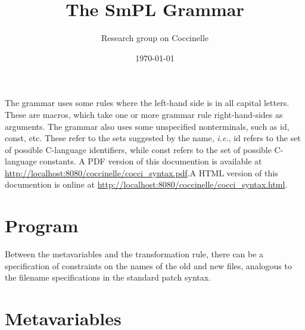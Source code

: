 \documentclass{article}
\title{The SmPL Grammar}
\author{Research group on Coccinelle}
\date{\today}
\begin{document}
\maketitle



The grammar uses some rules where the left-hand side is in all capital
letters.  These are macros, which take one or more grammar rule
right-hand-sides as arguments.  The grammar also uses some unspecified
nonterminals, such as {\sf id}, {\sf const}, etc.  These refer to the
sets suggested by the name, {\em i.e.}, {\sf id} refers to the set of
possible C-language identifiers, while {\sf const} refers to the set
of possible C-language constants. \ifhevea A PDF version of this
documention is available at
\url{http://localhost:8080/coccinelle/cocci_syntax.pdf}.\else A HTML
version of this documention is online at
\url{http://localhost:8080/coccinelle/cocci_syntax.html}. \fi

\section{Program}

\begin{grammar}



\end{grammar}

Between the metavariables and the transformation rule, there can be a
specification of constraints on the names of the old and new files,
analogous to the filename specifications in the standard patch syntax.

\section{Metavariables}
\end{document}
